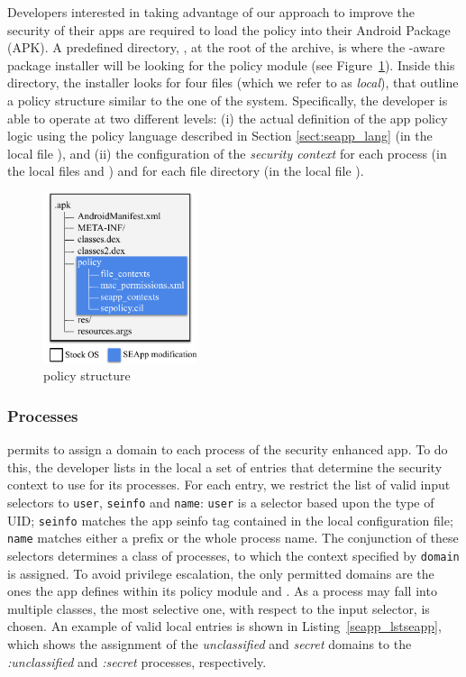 Developers interested in taking advantage of our approach to improve
the security of their apps are required to load the policy into their
Android Package (APK).  A predefined directory, \apkpolicydir, at the
root of the archive, is where the \seapp-aware package installer will be
looking for the policy module (see
Figure~\ref{fig:seapp_policy_folder}).  Inside this directory, the
installer looks for four files (which we refer to as {\em local}),
that outline a policy structure similar to the one of the system.
Specifically, the developer is able to operate at two different
levels: (i) the actual definition of the app policy logic using the
policy language described in Section \ref{sect:seapp_lang} (in the
local file \sepolicy), and (ii) the configuration of the {\em security
  context} for each process (in the local files \seappcontexts and
\macpermissions) and for each file directory (in the local file
\filecontexts).

\begin{figure}[t]
	\centering
	\includegraphics[width=0.4\textwidth]{chapters/seapp/figs/policy_folder}
	\caption{\seapp policy structure}
	\label{fig:seapp_policy_folder}
\end{figure}

\subsubsection{Processes}\label{subsub:seapp_process_control}

\seapp permits to assign a \sel domain to each process of the security
enhanced app.  To do this, the developer lists in the local
\seappcontexts a set of entries that determine the security context to
use for its processes.  For each entry, we restrict the list of valid
input selectors to {\tt user}, {\tt seinfo} and {\tt name}: {\tt user}
is a selector based upon the type of UID; {\tt seinfo} matches the app
seinfo tag contained in the local \macpermissions configuration file;
{\tt name} matches either a prefix or the whole process name.  The
conjunction of these selectors determines a class of processes, to
which the context specified by {\tt domain} is assigned.  To avoid
privilege escalation, the only permitted domains are the ones the app
defines within its policy module and \untrustedapp. As a process may
fall into multiple classes, the most selective one, with respect to
the input selector, is chosen.  An example of valid local
\seappcontexts entries is shown in Listing~\ref{seapp_lstseapp}, which
shows the assignment of the {\em unclassified} and {\em secret}
domains to the {\em :unclassified} and {\em :secret} processes,
respectively.

